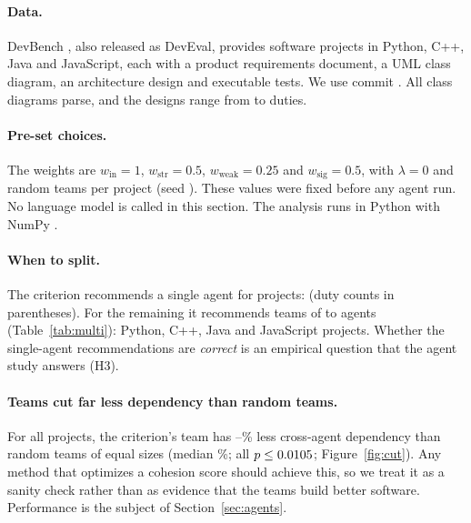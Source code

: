 \paragraph{Data.} DevBench \citep{li2024devbench}, also released as DevEval, provides \NProjects software projects in Python, C++, Java and JavaScript, each with a product requirements document, a UML class diagram, an architecture design and executable tests. We use commit \texttt{\DevBenchCommit}. All \NProjects class diagrams parse, and the designs range from \DutyMin to \DutyMax duties.

\paragraph{Pre-set choices.} The weights are $w_{\text{in}}{=}1$, $w_{\text{str}}{=}0.5$, $w_{\text{weak}}{=}0.25$ and $w_{\text{sig}}{=}0.5$, with $\lambda{=}0$ and \Draws random teams per project (seed \Seed). These values were fixed before any agent run. No language model is called in this section. The analysis runs in Python \PythonVersion with NumPy \NumpyVersion.

\paragraph{When to split.} The criterion recommends a single agent for \NSingle projects: (duty counts in parentheses). For the remaining \NMulti it recommends teams of \KMin to \KMax agents (Table~\ref{tab:multi}): \NMultiPython Python, \NMultiCpp C++, \NMultiJava Java and \NMultiJS JavaScript projects. Whether the single-agent recommendations are \emph{correct} is an empirical question that the agent study answers (H3).

\begin{table}[t]
\centering
\caption{Projects for which the criterion recommends a team ($k^\ast > 1$). Cls: classes; $n$: duties; Cut$\downarrow$: reduction in cross-agent dependency against \Draws random teams of the same sizes; $p$: one-sided permutation $p$-value; $\Delta$MQ$_{\text{GC}}$: MQ of the criterion's team minus MQ of one agent per class; ARI$_{\text{IM}}$: adjusted Rand index \citep{hubert1985ari} with the Infomap partition; Stable: weight settings (of 81) that give the same $k^\ast$.}
\label{tab:multi}
\small

\end{table}

\paragraph{Teams cut far less dependency than random teams.} For all \NMulti projects, the criterion's team has \CutRedMin--\CutRedMax\% less cross-agent dependency than random teams of equal sizes (median \CutRedMedian\%; all $p \le 0.0105$; Figure~\ref{fig:cut}). Any method that optimizes a cohesion score should achieve this, so we treat it as a sanity check rather than as evidence that the teams build better software. Performance is the subject of Section~\ref{sec:agents}.

